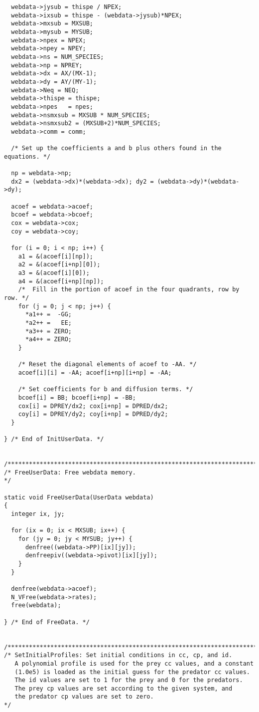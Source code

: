 \begin{verbatim}
  webdata->jysub = thispe / NPEX;
  webdata->ixsub = thispe - (webdata->jysub)*NPEX;
  webdata->mxsub = MXSUB;
  webdata->mysub = MYSUB;
  webdata->npex = NPEX;
  webdata->npey = NPEY;
  webdata->ns = NUM_SPECIES;
  webdata->np = NPREY;
  webdata->dx = AX/(MX-1);
  webdata->dy = AY/(MY-1);
  webdata->Neq = NEQ;
  webdata->thispe = thispe;
  webdata->npes   = npes;
  webdata->nsmxsub = MXSUB * NUM_SPECIES;
  webdata->nsmxsub2 = (MXSUB+2)*NUM_SPECIES;
  webdata->comm = comm;
  
  /* Set up the coefficients a and b plus others found in the equations. */

  np = webdata->np;
  dx2 = (webdata->dx)*(webdata->dx); dy2 = (webdata->dy)*(webdata->dy);

  acoef = webdata->acoef;
  bcoef = webdata->bcoef;
  cox = webdata->cox;
  coy = webdata->coy;

  for (i = 0; i < np; i++) {
    a1 = &(acoef[i][np]);
    a2 = &(acoef[i+np][0]);
    a3 = &(acoef[i][0]);
    a4 = &(acoef[i+np][np]);
    /*  Fill in the portion of acoef in the four quadrants, row by row. */
    for (j = 0; j < np; j++) {
      *a1++ =  -GG;
      *a2++ =   EE;
      *a3++ = ZERO;
      *a4++ = ZERO;
    }

    /* Reset the diagonal elements of acoef to -AA. */
    acoef[i][i] = -AA; acoef[i+np][i+np] = -AA;

    /* Set coefficients for b and diffusion terms. */
    bcoef[i] = BB; bcoef[i+np] = -BB;
    cox[i] = DPREY/dx2; cox[i+np] = DPRED/dx2;
    coy[i] = DPREY/dy2; coy[i+np] = DPRED/dy2;
  }

} /* End of InitUserData. */


/*************************************************************************/
/* FreeUserData: Free webdata memory.                                    */

static void FreeUserData(UserData webdata)
{
  integer ix, jy;

  for (ix = 0; ix < MXSUB; ix++) {
    for (jy = 0; jy < MYSUB; jy++) {
      denfree((webdata->PP)[ix][jy]);
      denfreepiv((webdata->pivot)[ix][jy]);
    }
  }

  denfree(webdata->acoef);
  N_VFree(webdata->rates);
  free(webdata);

} /* End of FreeData. */


/*************************************************************************/
/* SetInitialProfiles: Set initial conditions in cc, cp, and id.
   A polynomial profile is used for the prey cc values, and a constant
   (1.0e5) is loaded as the initial guess for the predator cc values.
   The id values are set to 1 for the prey and 0 for the predators.
   The prey cp values are set according to the given system, and
   the predator cp values are set to zero.                               */


\end{verbatim}
